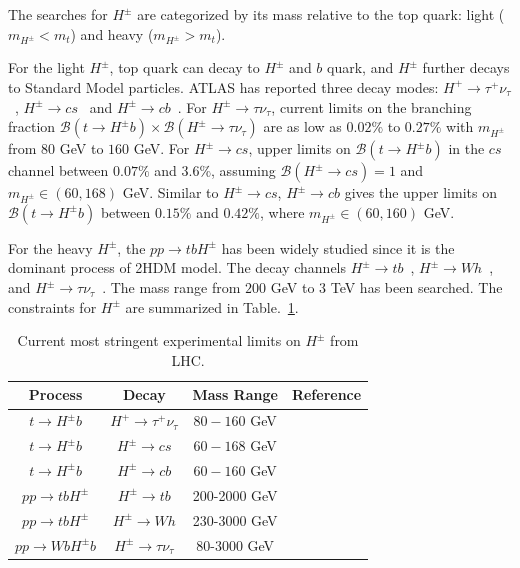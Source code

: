 \documentclass[a4paper,11pt]{article}
\begin{document}
The searches for $H^\pm$ are categorized by its mass relative to the top quark: light ($m_{H^\pm} < m_t$) and heavy ($m_{H^\pm} > m_t$).

For the light $H^\pm$, top quark can decay to $H^\pm$ and $b$ quark, 
and $H^\pm$ further decays to Standard Model particles. 
ATLAS has reported three decay modes: $H^+ \to \tau^+\nu_\tau$~\cite{ATLAS:2024hya}, $H^\pm \to cs$~\cite{ATLAS:2024oqu} and $H^\pm\to cb$~\cite{ATLAS:2023bzb}. 
For $H^\pm \to \tau\nu_\tau$, current limits on the branching fraction $\mathcal{B}(t \to H^\pm b) \times \mathcal{B}(H^\pm \to \tau\nu_\tau)$ are as low as $0.02\%$ to $0.27\%$ with $m_{H^\pm}$ from $80$ GeV to $160$ GeV.
For $H^\pm \to cs$, upper limits on $\mathcal{B}(t \to H^\pm b)$ in the $cs$ channel between $0.07\%$ and $3.6\%$, 
assuming $\mathcal{B}(H^\pm \to cs)=1$ and $m_{H^\pm}\in (60, 168)$ GeV.
Similar to $H^\pm \to cs$, $H^\pm\to cb$ gives the upper limits on $\mathcal{B}(t \to H^\pm b)$ between $0.15\%$ and $0.42\%$, where $m_{H^\pm}\in (60, 160)$ GeV.

For the heavy $H^\pm$, the $pp\to tbH^\pm$ has been widely studied since it is the dominant process of 2HDM model. 
The decay channels $H^\pm \to tb$~\cite{ATLAS:2021upq}, $H^\pm \to Wh$~\cite{ATLAS:2024rcu}, and $H^\pm \to \tau\nu_\tau$~\cite{ATLAS:2024hya}. 
The mass range from $200$ GeV to $3$ TeV has been searched. 
The constraints for $H^\pm$ are summarized in Table.~\ref{table:chargehiggs}.
\begin{table}
  \centering 
    \begin{tabular}{cccc}
    Process  & Decay & Mass Range & Reference \\
     \hline
$t\to H^\pm b$  & $H^+ \to \tau^+\nu_\tau$ &   
$80-160$ GeV       &   \cite{ATLAS:2024hya}        \\%
$t\to H^\pm b$  & $H^\pm\to cs$ &   
$60-168$ GeV       &    \cite{ATLAS:2024oqu}        \\%
$t\to H^\pm b$  & $H^\pm\to cb$ &   
$60-160$ GeV       &    \cite{ATLAS:2023bzb}        \\%
    \hline
    $pp\to tbH^\pm$ & $H^\pm\to tb$ & 200-2000 GeV & \cite{ATLAS:2021upq} \\
    $pp\to tbH^\pm$ & $H^\pm\to Wh$ & 230-3000 GeV & \cite{ATLAS:2024rcu} \\
    $pp\to WbH^\pm b$ & $H^\pm\to \tau\nu_\tau$ & 80-3000 GeV & \cite{ATLAS:2024hya} \\
    \hline
    \end{tabular}
      \caption{Current most stringent experimental limits on $H^\pm$ from LHC.}
      \label{table:chargehiggs}
  \end{table} 
\end{document}
